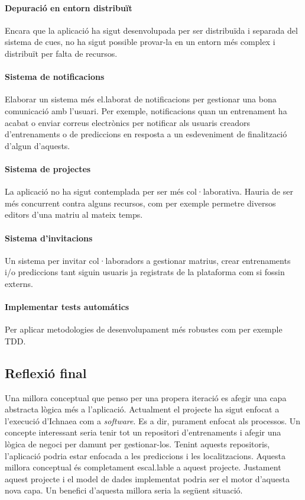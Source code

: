 \paragraph{Depuraci\'{o} en entorn distribuït} Encara que la aplicaci\'{o} ha sigut desenvolupada per ser distribuïda i separada del sistema de cues, no ha sigut possible provar-la en un entorn m\'{e}s complex i distribuït per falta de recursos.

\paragraph{Sistema de notificacions} Elaborar un sistema m\'{e}s el.laborat de notificacions per gestionar una bona comunicació amb l'usuari. Per exemple, notificacions quan un entrenament ha acabat o enviar correus electrònics per notificar als usuaris creadors d'entrenaments o de prediccions en resposta a un esdeveniment de finalitzaci\'{o} d'algun d'aquests. 

\paragraph{Sistema de projectes} La aplicaci\'{o} no ha sigut contemplada per ser m\'{e}s col·laborativa. Hauria de ser m\'{e}s concurrent contra alguns recursos, com per exemple permetre diversos editors d'una matriu al mateix temps.

\paragraph{Sistema d'invitacions} Un sistema per invitar col·laboradors a gestionar matrius, crear entrenaments i/o prediccions tant siguin usuaris ja registrats de la plataforma com si fossin externs.

\paragraph{Implementar tests autom\'{a}tics} Per aplicar metodologies de desenvolupament m\'{e}s robustes com per exemple TDD.\cite{tdd}

\subsection{Reflexió final}
Una millora conceptual que penso per una propera iteració es afegir una capa abstracta lògica m\'{e}s a l'aplicació. Actualment el projecte ha sigut enfocat a l'execució d'Ichnaea com a \textit{software}. Es a dir, purament enfocat als processos. Un concepte interessant seria tenir tot un repositori d'entrenaments i afegir una lògica de negoci per damunt per gestionar-los. Tenint aquests repositoris, l'aplicació podria estar enfocada a les prediccions i les localitzacions. Aquesta millora conceptual \'{e}s completament escal.lable a aquest projecte. Justament aquest projecte i el model de dades implementat podria ser el motor d'aquesta nova capa. Un benefici d'aquesta millora seria la següent situació.\\

